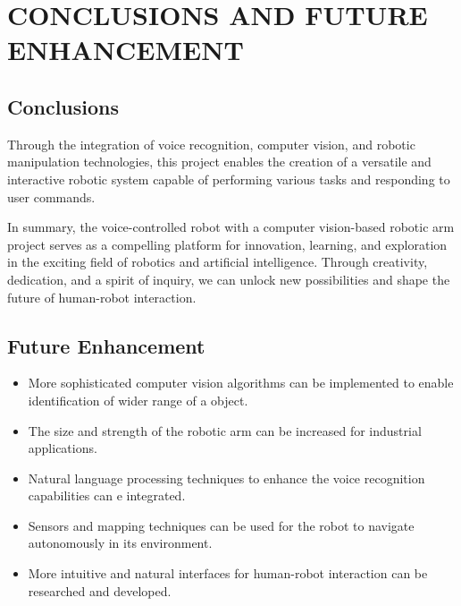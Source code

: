 \chapter{CONCLUSIONS AND FUTURE ENHANCEMENT}
\section{Conclusions}
Through the integration of voice recognition, computer vision, and robotic manipulation technologies, this project enables the creation of a versatile and interactive robotic system capable of performing various tasks and responding to user commands.

In summary, the voice-controlled robot with a computer vision-based robotic arm project serves as a compelling platform for innovation, learning, and exploration in the exciting field of robotics and artificial intelligence. Through creativity, dedication, and a spirit of inquiry, we can unlock new possibilities and shape the future of human-robot interaction.

\section{Future Enhancement}
\begin{itemize}
    \item More sophisticated computer vision algorithms can be implemented to enable identification of wider range of a object.
    \item The size and strength of the robotic arm can be increased for industrial applications.
    \item Natural language processing techniques to enhance the voice recognition capabilities can e integrated. 
    \item Sensors and mapping techniques can be used for the robot to navigate autonomously in its environment. 
    \item More intuitive and natural interfaces for human-robot interaction can be researched and developed.
\end{itemize}
